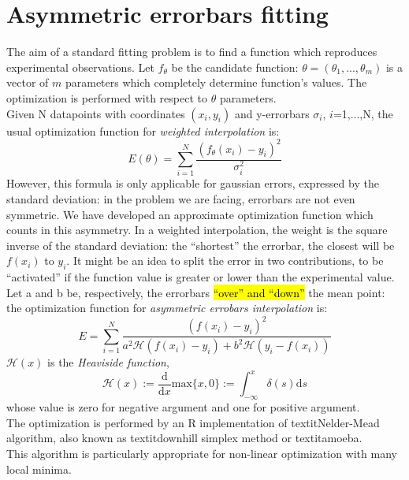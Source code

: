 \section{Asymmetric errorbars fitting}
The aim of a standard fitting problem is to find a function which
reproduces experimental observations.
Let $f_{\theta}$ be the candidate function:
$\theta=(\theta_1,...,\theta_m)$ is a vector of $m$ parameters which
completely determine function's values.
The optimization is performed with respect to $\theta$ parameters.\\
Given N datapoints with coordinates ${(x_i,y_i)}$ and y-errorbars
$\sigma_i$, $i$=1,...,N, the usual optimization function for
\textit{weighted interpolation}\cite{interpolation} is:
$$
E(\theta)= \sum_{i=1}^{N} \frac{(f_{\theta}(x_i)-y_i)^2}{\sigma_{i}^2}
$$
However, this formula is only applicable for gaussian errors,
expressed by the standard deviation: in the problem we are facing,
errorbars are not even symmetric.
We have developed an approximate optimization function which counts
in this asymmetry.
In a weighted interpolation, the weight is the square inverse of the
standard deviation: the ``shortest'' the errorbar, the closest will
be $f(x_i)$ to $y_i$.
It might be an idea to split the error in two contributions,
to be ``activated'' if the function value is greater or lower
than the experimental value.
Let a and b be, respectively, the errorbars \hl{``over'' and ``down''}
the mean point: the optimization function for \textit{asymmetric
  errobars interpolation} is:
$$ E= \sum_{i=1}^{N} \frac{(f(x_i)-y_i)^2}{a^{2}\mathcal{H}(f(x_i)-y_i)+b^{2}\mathcal{H}(y_i-f(x_i))} $$
$\mathcal{H}(x)$ is the \textit{Heaviside function},
$$\mathcal{H}(x):=\frac{\mathrm{d}}{\mathrm{d}x}\mathrm{max}
\{x,0\}:=\int_{-\infty}^x \delta (s) \mathrm{d}s$$ whose value
is zero for negative argument and one for positive argument.\\
The optimization is performed by an R implementation\cite{Roptim}
of textit{Nelder-Mead algorithm}\cite{neldermeadoriginal},
also known as textit{downhill simplex method} or
textit{amoeba}\cite{neldermeadnumrec}.\\
This algorithm is particularly appropriate for non-linear
optimization with many local minima.
